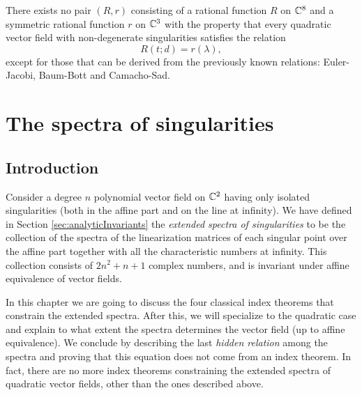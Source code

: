 \documentclass[phd,tocprelim]{cornell}
\begin{document}
\begin{theorem}\label{thm:noIndexTheorem}
 There exists no pair $(R,r)$ consisting of a rational function $R$ on $\mathbb{C}^8$ and a symmetric rational function $r$ on $\mathbb{C}^3$ with the property that every quadratic vector field with non-degenerate singularities satisfies the relation
  \[ R(t;d)=r(\lambda), \]
 except for those that can be derived from the previously known relations: Euler-Jacobi, Baum-Bott and Camacho-Sad.
\end{theorem}










\chapter{The spectra of singularities}

\section{Introduction}

Consider a degree $n$ polynomial vector field on $\mathbb{C}^2$ having only isolated singularities (both in the affine part and on the line at infinity). We have defined in Section \ref{sec:analyticInvariants} the \textit{extended spectra of singularities} to be the collection of the spectra of the linearization matrices of each singular point over the affine part together with all the characteristic numbers at infinity. This collection consists of $2n^2+n+1$ complex numbers, and is invariant under affine equivalence of vector fields.

In this chapter we are going to discuss the four classical index theorems that constrain the extended spectra. After this, we will specialize to the quadratic case and explain to what extent the spectra determines the vector field (up to affine equivalence). We conclude by describing the last \textit{hidden relation} among the spectra and proving that this equation does not come from an index theorem. In fact, there are no more index theorems constraining the extended spectra of quadratic vector fields, other than the ones described above.


\end{document}
